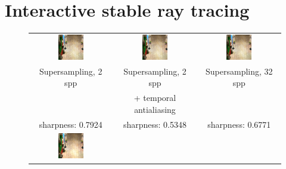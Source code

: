 \section{Interactive stable ray tracing}
\begin{figure}
\begin{tabular}{@{}c@{}c@{}@{}c@{}}
	 \includegraphics[width=0.33\textwidth]{figures/ss_2x_rect_370_300_300_300_frame_211.png} &
		 \includegraphics[width=0.33\textwidth]{figures/ss_2x_taa_rect_370_300_300_300_frame_211.png} &
		  \includegraphics[width=0.33\textwidth]{figures/ss_32x_rect_370_300_300_300_frame_211.png} \\	 
Supersampling, 2 spp & Supersampling, 2 spp 	& Supersampling, 32 spp \\
  					 & + temporal antialiasing 	&  \\
sharpness: 0.7924 & sharpness: 0.5348 & sharpness: 0.6771  \\
	 \includegraphics[width=0.33\textwidth]{figures/srt_1_rect_370_300_300_300_frame_211.png} &

\end{tabular}
\end{figure}
